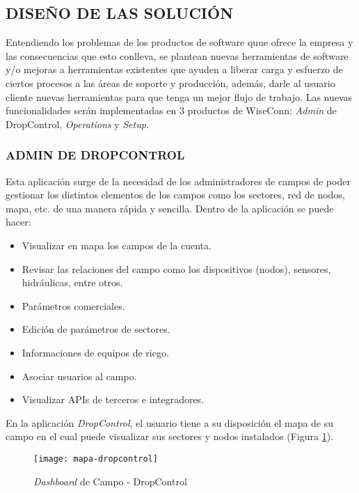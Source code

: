 

\subsection{DISEÑO DE LAS SOLUCIÓN}

Entendiendo los problemas de los productos de software quue ofrece la empresa y las consecuencias que esto conlleva,
se plantean nuevas herramientas de software y/o mejoras a herramientas existentes que ayuden a liberar carga y esfuerzo
de ciertos procesos a las áreas de soporte y producción, además, darle al usuario cliente nuevas herramientas para que tenga un mejor flujo de trabajo.
Las nuevas funcionalidades serán implementadas en 3 productos de WiseConn: \textit{Admin} de DropControl, \textit{Operations} y \textit{Setup}.

\subsubsection{ADMIN DE DROPCONTROL}

Esta aplicación surge de la necesidad de los administradores de campos de poder gestionar los distintos elementos de los campos como los sectores, red de nodos, mapa, etc. de una manera rápida y sencilla.
Dentro de la aplicación se puede hacer:

\begin{itemize}
    \item Visualizar en mapa los campos de la cuenta.
    \item Revisar las relaciones del campo como los dispositivos (nodos), sensores, hidráulicas, entre otros.
    \item Parámetros comerciales.
    \item Edición de parámetros de sectores.
    \item Informaciones de equipos de riego.
    \item Asociar usuarios al campo.
    \item Visualizar APIs de terceros e integradores.
\end{itemize}


En la aplicación \textit{DropControl}, el usuario tiene a su disposición el mapa de su campo en el cual puede visualizar sus sectores y nodos instalados (Figura \ref{fig:mapa-dropcontrol}).
\begin{figure}[H]
	\centering
	\texttt{[image: mapa-dropcontrol]}
	\caption{\label{fig:mapa-dropcontrol} \textit{Dashboard} de Campo - DropControl}
\end{figure}

